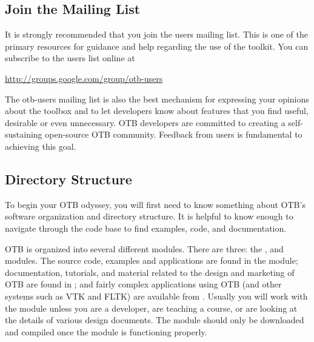 \subsection{Join the Mailing List}
\label{sec:JoinMailList}


It is strongly recommended that you join the users mailing list. This is one
of the primary resources for guidance and help regarding the use of the 
toolkit. You can subscribe to the users list online at

\begin{center}
\url{http://groups.google.com/group/otb-users}
\end{center} 

The otb-users mailing list is also the best mechanism for expressing your
opinions about the toolbox and to let developers know about features that you
find useful, desirable or even unnecessary. OTB developers are committed to
creating a self-sustaining open-source OTB community. Feedback from users is
fundamental to achieving this goal.

\subsection{Directory Structure}
\label{sec:DirectoryStructure}

To begin your OTB odyssey, you will first need to know something about OTB's
software organization and directory structure. It is helpful to know enough to navigate through the
code base to find examples, code, and documentation.

OTB is organized into several different modules. There are three:
the ,  and 
modules. The source code, examples and applications are found in the
 module; documentation, tutorials, and material related to the
design and marketing of OTB are found in ; and fairly
complex applications using OTB (and other systems such as VTK and FLTK)
are available from . Usually you will work with the
 module unless you are a developer, are teaching a course, or
are looking at the details of various design documents. The
 module should only be downloaded and
compiled once
the  module is functioning properly.

